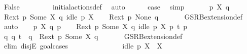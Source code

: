 \begin{isabellebody}
\ False\ \isanewline
\ \ \ \ \ \ \isamarkupfalse%
\ initial{\isacharunderscore}{\kern0pt}actions{\isacharunderscore}{\kern0pt}def\ \isamarkupfalse%
\ auto\isanewline
\ \ \ \ \isamarkupfalse%
\ {\isacharquery}{\kern0pt}case\ \isamarkupfalse%
\ simp\isanewline
\ \ \isamarkupfalse%
\isanewline
{}\isamarkupfalse%
\isanewline
\ \ \isamarkupfalse%
\ p\ X\ q\isanewline
\ \ \isamarkupfalse%
\ {\isacartoucheopen}{\isacharquery}{\kern0pt}R{\isacharunderscore}{\kern0pt}ext\ p\ {\isacharparenleft}{\kern0pt}Some\ X{\isacharparenright}{\kern0pt}\ q{\isacartoucheclose}\ {\isacartoucheopen}idle\ p\ X{\isacartoucheclose}\isanewline
\ \ \isamarkupfalse%
\ {\isacartoucheopen}{\isacharquery}{\kern0pt}R{\isacharunderscore}{\kern0pt}ext\ p\ None\ q{\isacartoucheclose}\ \isanewline
\ \ \ \ \isamarkupfalse%
\ GSRB{\isacharunderscore}{\kern0pt}extension{\isacharunderscore}{\kern0pt}def\ \isamarkupfalse%
\ auto\isanewline
{}\isamarkupfalse%
\isanewline
\ \ \isamarkupfalse%
\ p\ X\ q\ p{\isacharprime}{\kern0pt}\isanewline
\ \ \isamarkupfalse%
\ {\isacartoucheopen}{\isacharquery}{\kern0pt}R{\isacharunderscore}{\kern0pt}ext\ p\ {\isacharparenleft}{\kern0pt}Some\ X{\isacharparenright}{\kern0pt}\ q{\isacartoucheclose}\ {\isacartoucheopen}idle\ p\ X{\isacartoucheclose}\ {\isacartoucheopen}p\ {\isasymlongmapsto}t\ p{\isacharprime}{\kern0pt}{\isacartoucheclose}\isanewline
\ \ \isamarkupfalse%
\ {\isacartoucheopen}{\isasymexists}q{\isacharprime}{\kern0pt}{\isachardot}{\kern0pt}\ q\ {\isasymlongmapsto}t\ \ q{\isacharprime}{\kern0pt}\ {\isasymand}\ {\isacharquery}{\kern0pt}R{\isacharunderscore}{\kern0pt}ext\ p{\isacharprime}{\kern0pt}\ {\isacharparenleft}{\kern0pt}Some\ X{\isacharparenright}{\kern0pt}\ q{\isacharprime}{\kern0pt}{\isacartoucheclose}\ \isanewline
\ \ \ \ \isamarkupfalse%
\ GSRB{\isacharunderscore}{\kern0pt}extension{\isacharunderscore}{\kern0pt}def\isanewline
\ \ \isamarkupfalse%
\ {\isacharparenleft}{\kern0pt}elim\ disjE{\isacharcomma}{\kern0pt}\ goal{\isacharunderscore}{\kern0pt}cases{\isacharparenright}{\kern0pt}\isanewline
\ \ \ \ \isamarkupfalse%
\ {}\isanewline
\ \ \ \ \isamarkupfalse%
\ {}{\isacharparenleft}{\kern0pt}{}{\isacharparenright}{\kern0pt}\ \isamarkupfalse%
\ {\isacartoucheopen}idle\ p\ {\isacharparenleft}{\kern0pt}X\ {\isasymunion}\ X{\isacharparenright}{\kern0pt}{\isacartoucheclose}\ \isamarkupfalse%

\end{isabellebody}
